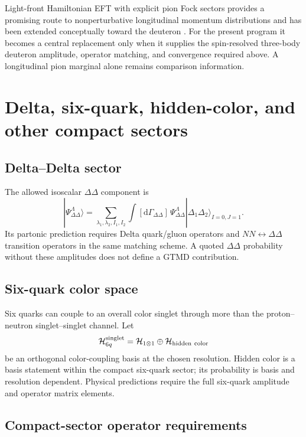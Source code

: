 \documentclass[11pt]{article}
\newcommand{\dd}{\mathrm{d}}
\newcommand{\Hil}{\mathcal H}
\newcommand{\DD}{\Delta\Delta}
\newcommand{\sixq}{6q}
\begin{document}
Light-front Hamiltonian EFT with explicit pion Fock sectors provides a
promising route to nonperturbative longitudinal momentum distributions and
has been extended conceptually toward the deuteron
\cite{CaoEtAl2026}.  For the present program it becomes a central replacement
only when it supplies the spin-resolved three-body deuteron amplitude,
operator matching, and convergence required above.  A longitudinal pion
marginal alone remains comparison information.

\section{Delta, six-quark, hidden-color, and other compact sectors}
\label{sec:compact-sectors}

\subsection{Delta--Delta sector}

The allowed isoscalar \(\Delta\Delta\) component is
\begin{equation}
 |\Psi_{\DD}^{\Lambda}\rangle
 =\sum_{\lambda_1,\lambda_2,I_1,I_2}
 \int[\dd\Gamma_{\DD}]\,
 \Psi_{\DD}^{\Lambda}
 |\Delta_1\Delta_2\rangle_{I=0,J=1}.
\label{eq:deltadelta-state}
\end{equation}
Its partonic prediction requires Delta quark/gluon operators and
\(NN\leftrightarrow\Delta\Delta\) transition operators in the same matching
scheme.  A quoted \(\Delta\Delta\) probability without these amplitudes does
not define a GTMD contribution.

\subsection{Six-quark color space}

Six quarks can couple to an overall color singlet through more than the
proton--neutron singlet--singlet channel.  Let
\begin{equation}
 \Hil_{\sixq}^{\rm singlet}
 =\Hil_{1\otimes1}
 \oplus\Hil_{\rm hidden\ color}
\label{eq:sixq-color-decomposition}
\end{equation}
be an orthogonal color-coupling basis at the chosen resolution.  Hidden color
is a basis statement within the compact six-quark sector; its probability is
basis and resolution dependent.  Physical predictions require the full
six-quark amplitude and operator matrix elements.

\subsection{Compact-sector operator requirements}
\end{document}
